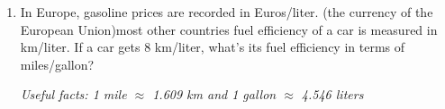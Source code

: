 \documentclass[12pt]{article}
\begin{document}
\begin{enumerate}
\begin{enumerate}
\end{enumerate}

\noindent \hrulefill
\item In Europe, gasoline prices are recorded in Euros/liter.   (the currency of the European Union)most other countries fuel efficiency of a car is measured in km/liter.  If a car gets 8 km/liter, what's its fuel efficiency in terms of miles/gallon?

\emph{Useful facts:  1 mile $\approx$ 1.609 km and 1 gallon $\approx$ 4.546 liters }
\vfill


\end{enumerate}




\newpage
\end{document}
